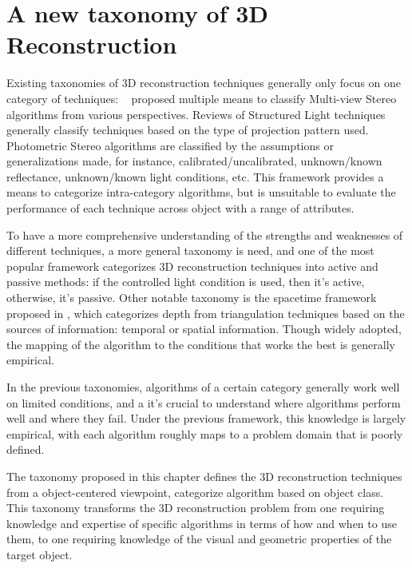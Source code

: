 
\chapter{A new taxonomy of 3D Reconstruction}
\label{ch:3DRecon_Taxo}
Existing taxonomies of 3D reconstruction techniques generally only focus on one category of techniques: ~\citeauthor{seitz2006comparison} proposed  multiple means to classify Multi-view Stereo algorithms from various perspectives. Reviews \cite{geng2011structured, salvi2004pattern} of Structured Light techniques generally classify techniques based on the type of projection pattern used. Photometric Stereo algorithms are classified by the assumptions or generalizations made, for instance, calibrated/uncalibrated, unknown/known reflectance, unknown/known light conditions, etc. This framework provides a means to categorize intra-category algorithms, but is unsuitable to evaluate the performance of each technique across object with a range of attributes.

To have a more comprehensive understanding of the strengths and weaknesses of different techniques, a more general taxonomy is need, and one of the most popular framework categorizes 3D reconstruction techniques into active and passive methods: if the controlled light condition is used, then it's active, otherwise, it's passive. Other notable taxonomy is the spacetime framework proposed in \cite{davis2003spacetime}, which categorizes depth from triangulation techniques based on the sources of information: temporal or spatial information. Though widely adopted, the mapping of the algorithm to the conditions that works the best is generally empirical.

In the previous taxonomies, algorithms of a certain category generally work well on limited conditions, and a it's crucial to understand where algorithms perform well and where they fail. Under the previous framework, this knowledge is largely empirical, with each algorithm roughly maps to a problem domain that is poorly defined.

The taxonomy proposed in this chapter defines the 3D reconstruction techniques from a object-centered viewpoint, \ie categorize algorithm based on object class. This taxonomy transforms the 3D reconstruction problem from one requiring knowledge and expertise of specific algorithms in terms of how and when to use them, to one requiring knowledge of the visual and geometric properties of the target object.

